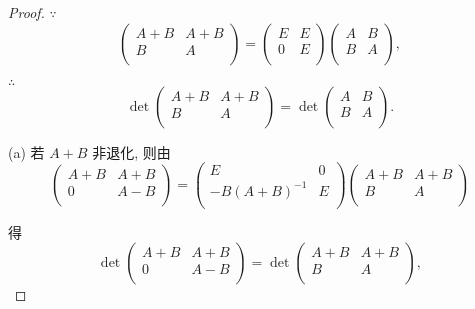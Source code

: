 \documentclass[color=black,device=normal,lang=cn,mode=geye]{elegantnote}
\begin{document}
\begin{proof}
    $\because$
    \[\begin{pmatrix}
        A+B & A+B \\
        B & A \\
    \end{pmatrix}=\begin{pmatrix}
        E & E \\
        0 & E \\
    \end{pmatrix}\begin{pmatrix}
        A & B \\
        B & A \\
    \end{pmatrix},\]

    $\therefore$
    \[\det\begin{pmatrix}
        A+B & A+B \\
        B & A \\
    \end{pmatrix}=\det\begin{pmatrix}
        A & B \\
        B & A \\
    \end{pmatrix}.\]

    (a) 若 $A+B$ 非退化, 则由
    \[\begin{pmatrix}
        A+B & A+B \\
        0 & A-B \\
    \end{pmatrix}=\begin{pmatrix}
        E & 0 \\
        -B(A+B)^{-1} & E \\
    \end{pmatrix}\begin{pmatrix}
        A+B & A+B \\
        B & A \\
    \end{pmatrix}\]

    得
    \[\det\begin{pmatrix}
        A+B & A+B \\
        0 & A-B \\
    \end{pmatrix}=\det\begin{pmatrix}
        A+B & A+B \\
        B & A \\
    \end{pmatrix},\]


\end{proof}
\end{document}

